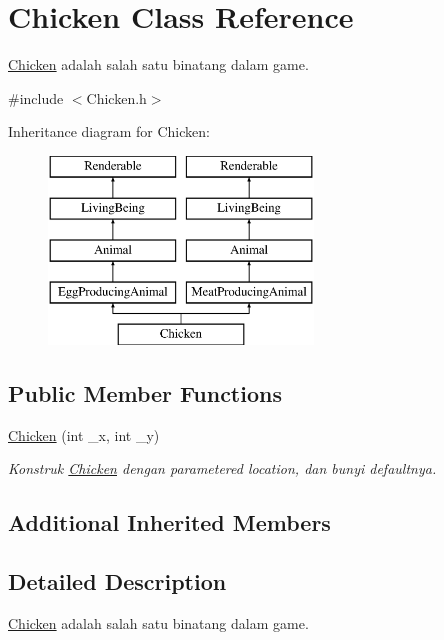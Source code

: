 \hypertarget{classChicken}{}\section{Chicken Class Reference}
\label{classChicken}


\mbox{\hyperlink{classChicken}{Chicken}} adalah salah satu binatang dalam game.  




{\ttfamily \#include $<$Chicken.\+h$>$}

Inheritance diagram for Chicken\+:\begin{figure}[H]
\begin{center}
\leavevmode
\includegraphics[height=5.000000cm]{classChicken}
\end{center}
\end{figure}
\subsection*{Public Member Functions}
\begin{DoxyCompactItemize}
\item 
\mbox{\hyperlink{classChicken_a4ca0ca08ac03410d9551564b7bf77c8d}{Chicken}} (int \+\_\+x, int \+\_\+y)
\begin{DoxyCompactList}\small\item\em Konstruk \mbox{\hyperlink{classChicken}{Chicken}} dengan parametered location, dan bunyi defaultnya. \end{DoxyCompactList}\end{DoxyCompactItemize}
\subsection*{Additional Inherited Members}


\subsection{Detailed Description}
\mbox{\hyperlink{classChicken}{Chicken}} adalah salah satu binatang dalam game. 

